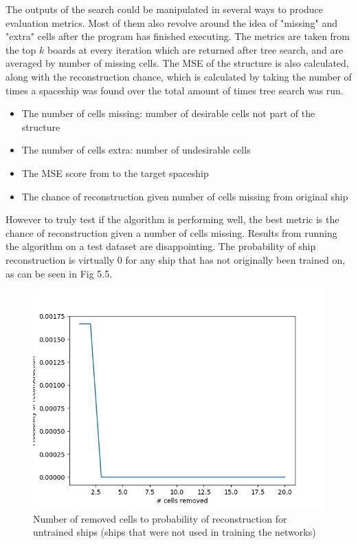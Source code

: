\documentclass{l4proj}
\begin{document}

The outputs of the search could be manipulated in several ways to produce evaluation metrics. Most of them also revolve around the idea of "missing" and "extra" cells after the program has finished executing. The metrics are taken from the top $k$ boards at every iteration which are returned after tree search, and are averaged by number of missing cells. The MSE of the structure is also calculated, along with the reconstruction chance, which is calculated by taking the number of times a spaceship was found over the total amount of times tree search was run.


\begin{itemize}
    \item The number of cells missing: number of desirable cells not part of the structure
    \item The number of cells extra: number of undesirable cells
    \item The MSE score from to the target spaceship
    \item The chance of reconstruction given number of cells missing from original ship
\end{itemize}

However to truly test if the algorithm is performing well, the best metric is the chance of reconstruction given a number of cells missing. Results from running the algorithm on a test dataset are disappointing. The probability of ship reconstruction is virtually 0 for any ship that has not originally been trained on, as can be seen in Fig 5.5.

\begin{figure}[h!]
\centering
\includegraphics[width=0.8\linewidth]{dissertation/images/graphs/probability_of_reconstruction_against_damage_testin_only.png}
\caption{Number of removed cells to probability of reconstruction for untrained ships (ships that were not used in training the networks)}
\label{fig:subim1}
\end{figure}
\end{document}
